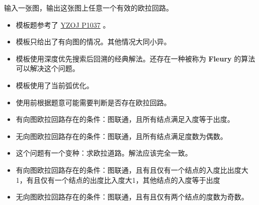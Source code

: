 \noindent 输入一张图，输出这张图上任意一个有效的欧拉回路。

\begin{itemize}
    \item 模板题参考了 \href{https://oiproxy.bugminer.top/OnlineJudge/problem_show.php?id=1037}{YZOJ P1037} 。
    \item 模板只给出了有向图的情况。其他情况大同小异。
    \item 模板使用深度优先搜索后回溯的经典解法。还存在一种被称为 \textbf{Fleury} 的算法可以解决这个问题。
    \item 模板使用了当前弧优化。
    \item 使用前根据题意可能需要判断是否存在欧拉回路。
    \item 有向图欧拉回路存在的条件：图联通，且所有结点满足入度等于出度。
    \item 无向图欧拉回路存在的条件：图联通，且所有结点满足度数为偶数。
    \item 这个问题有一个变种：求欧拉道路。解法应该完全一致。
    \item 有向图欧拉回路存在的条件：图联通，且有且仅有一个结点的入度比出度大1，有且仅有一个结点的出度比入度大1，其他结点的入度等于出度
    \item 无向图欧拉回路存在的条件：图联通，且有且仅有两个结点的度数为奇数。
\end{itemize}